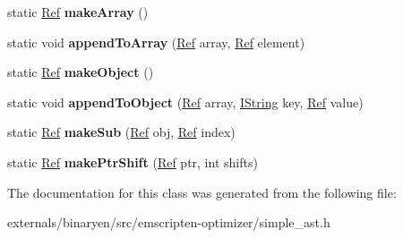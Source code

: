 \begin{DoxyCompactItemize}
static \mbox{\hyperlink{structcashew_1_1_ref}{Ref}} {\bfseries make\+Array} ()
\item 
\mbox{\label{classcashew_1_1_value_builder_a527e79ce8792fc11cf094f71b62d1c2a}} 
static void {\bfseries append\+To\+Array} (\mbox{\hyperlink{structcashew_1_1_ref}{Ref}} array, \mbox{\hyperlink{structcashew_1_1_ref}{Ref}} element)
\item 
\mbox{\label{classcashew_1_1_value_builder_a803973468272f6b2bc10d52e427cbc14}} 
static \mbox{\hyperlink{structcashew_1_1_ref}{Ref}} {\bfseries make\+Object} ()
\item 
\mbox{\label{classcashew_1_1_value_builder_a5cbec6e2ee72ab14a97daf6b5e269625}} 
static void {\bfseries append\+To\+Object} (\mbox{\hyperlink{structcashew_1_1_ref}{Ref}} array, \mbox{\hyperlink{structcashew_1_1_i_string}{I\+String}} key, \mbox{\hyperlink{structcashew_1_1_ref}{Ref}} value)
\item 
\mbox{\label{classcashew_1_1_value_builder_aadf8a3bf696bbeeae1e482872dc489bb}} 
static \mbox{\hyperlink{structcashew_1_1_ref}{Ref}} {\bfseries make\+Sub} (\mbox{\hyperlink{structcashew_1_1_ref}{Ref}} obj, \mbox{\hyperlink{structcashew_1_1_ref}{Ref}} index)
\item 
\mbox{\label{classcashew_1_1_value_builder_a6f764aea2aadea47c62a0b599f8527cb}} 
static \mbox{\hyperlink{structcashew_1_1_ref}{Ref}} {\bfseries make\+Ptr\+Shift} (\mbox{\hyperlink{structcashew_1_1_ref}{Ref}} ptr, int shifts)
\end{DoxyCompactItemize}


The documentation for this class was generated from the following file\+:\begin{DoxyCompactItemize}
\item 
externals/binaryen/src/emscripten-\/optimizer/simple\+\_\+ast.\+h\end{DoxyCompactItemize}
